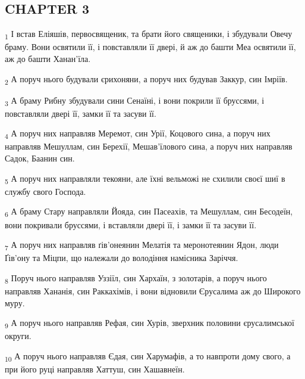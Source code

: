 \subsection{CHAPTER 3}
\begin{tcolorbox}
\textsubscript{1} І встав Еліяшів, первосвященик, та брати його священики, і збудували Овечу браму. Вони освятили її, і повставляли її двері, й аж до башти Меа освятили її, аж до башти Ханан'їла.
\end{tcolorbox}
\begin{tcolorbox}
\textsubscript{2} А поруч нього будували єрихоняни, а поруч них будував Заккур, син Імріїв.
\end{tcolorbox}
\begin{tcolorbox}
\textsubscript{3} А браму Рибну збудували сини Сенаїні, і вони покрили її бруссями, і повставляли двері її, замки її та засуви її.
\end{tcolorbox}
\begin{tcolorbox}
\textsubscript{4} А поруч них направляв Меремот, син Урії, Коцового сина, а поруч них направляв Мешуллам, син Берехії, Мешав'їлового сина, а поруч них направляв Садок, Баанин син.
\end{tcolorbox}
\begin{tcolorbox}
\textsubscript{5} А поруч них направляли текояни, але їхні вельможі не схилили своєї шиї в службу свого Господа.
\end{tcolorbox}
\begin{tcolorbox}
\textsubscript{6} А браму Стару направляли Йояда, син Пасеахів, та Мешуллам, син Бесодеїн, вони покривали бруссями, і вставляли двері її, і замки її та засуви її.
\end{tcolorbox}
\begin{tcolorbox}
\textsubscript{7} А поруч них направляв ґів'онеянин Мелатія та меронотеянин Ядон, люди Ґів'ону та Міцпи, що належали до володіння намісника Заріччя.
\end{tcolorbox}
\begin{tcolorbox}
\textsubscript{8} Поруч нього направляв Уззіїл, син Хархаїн, з золотарів, а поруч нього направляв Хананія, син Раккахімів, і вони відновили Єрусалима аж до Широкого муру.
\end{tcolorbox}
\begin{tcolorbox}
\textsubscript{9} А поруч нього направляв Рефая, син Хурів, зверхник половини єрусалимської округи.
\end{tcolorbox}
\begin{tcolorbox}
\textsubscript{10} А поруч нього направляв Єдая, син Харумафів, а то навпроти дому свого, а при його руці направляв Хаттуш, син Хашавнеїн.
\end{tcolorbox}
